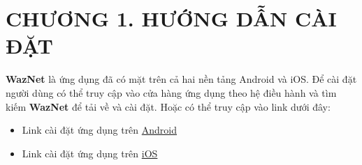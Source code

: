 
\section*{CHƯƠNG 1. HƯỚNG DẪN CÀI ĐẶT}
\setcounter{section}{1}
\setcounter{subsection}{0} %
\setcounter{table}{0} %
\setcounter{figure}{0} %
\textbf{WazNet} là ứng dụng đã có mặt trên cả hai nền tảng Android và iOS. Để cài đặt người dùng có thể truy cập vào cửa hàng ứng dụng theo hệ điều hành và tìm kiếm \textbf{WazNet} để tải về và cài đặt. Hoặc có thể truy cập vào link dưới đây:
\begin{adjustwidth}{1.5em}{}
  \begin{itemize}
    \item Link cài đặt ứng dụng trên \href{https://play.google.com/store/apps/details?id=vn.sparc.waznet}{Android}
    \item Link cài đặt ứng dụng trên \href{https://apps.apple.com/vn/app/waznet/id6738925384}{iOS}
  \end{itemize}
\end{adjustwidth}



\newpage
